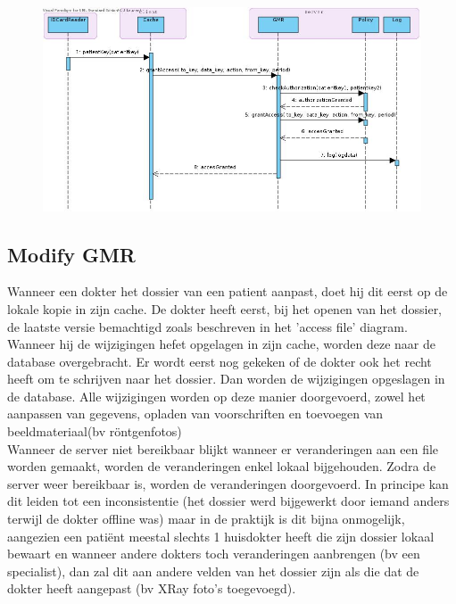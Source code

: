\documentclass[a4paper,10pt]{article}
\begin{document}
\begin{center}
    \begin{figure}[!h]
      \includegraphics[width=\textwidth]{../images/grantAccess.jpg}
    \end{figure}
  \end{center}

\subsection{Modify GMR}
Wanneer een dokter het dossier van een patient aanpast, doet hij dit eerst op de lokale kopie in zijn cache. De dokter heeft eerst, bij het openen van het dossier, de laatste versie bemachtigd zoals beschreven in het 'access file' diagram. Wanneer hij de wijzigingen hefet opgelagen in zijn cache, worden deze naar de database overgebracht. Er wordt eerst nog gekeken of de dokter ook het recht heeft om te schrijven naar het dossier. Dan worden de wijzigingen opgeslagen in de database. Alle wijzigingen worden op deze manier doorgevoerd, zowel het aanpassen van gegevens, opladen van voorschriften en toevoegen van beeldmateriaal(bv röntgenfotos)\\
Wanneer de server niet bereikbaar blijkt wanneer er veranderingen aan een file worden gemaakt, worden de veranderingen enkel lokaal bijgehouden. Zodra de server weer bereikbaar is, worden de veranderingen doorgevoerd. In principe kan dit leiden tot een inconsistentie (het dossier werd bijgewerkt door iemand anders terwijl de dokter offline was) maar in de praktijk is dit bijna onmogelijk, aangezien een patiënt meestal slechts 1 huisdokter heeft die zijn dossier lokaal bewaart en wanneer andere dokters toch veranderingen aanbrengen (bv een specialist), dan zal dit aan andere velden van het dossier zijn als die dat de dokter heeft aangepast (bv XRay foto's toegevoegd). 
\end{document}
